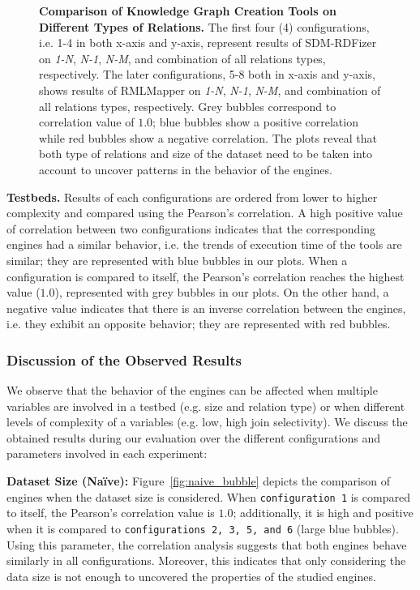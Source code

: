 \begin{figure}[!tb]
    \caption[Knowledge Graph Creation Tools on Different Types of Relations]{\textbf{Comparison of Knowledge Graph Creation Tools on Different Types of Relations.} The first four (4) configurations, i.e. 1-4 in both x-axis and y-axis, represent results of SDM-RDFizer on \textit{1-N}, \textit{N-1}, \textit{N-M}, and combination of all relations types, respectively. The later configurations, 5-8 both in x-axis and y-axis, shows results of RMLMapper on \textit{1-N}, \textit{N-1}, \textit{N-M}, and combination of all relations types, respectively. Grey bubbles correspond to correlation value of $1.0$; blue bubbles show a positive correlation while red bubbles show a negative correlation. The plots reveal that both type of relations and size of the dataset need to be taken into account to uncover patterns in the behavior of the engines. 
    }
    \label{fig:relation_type_bubble}
\end{figure}


\noindent \textbf{Testbeds.}
Results of each configurations are ordered from lower to higher complexity and compared using the Pearson's correlation. 
A high positive value of correlation between two configurations indicates that the corresponding engines had a similar behavior, i.e. the trends of execution time of the tools are similar; they are represented with blue bubbles in our plots. When a configuration is compared to itself, the Pearson's correlation reaches the highest value ($1.0$), represented with grey bubbles in our plots. 
On the other hand, a negative value indicates that there is an inverse correlation between the engines, i.e. they exhibit an opposite behavior; they are represented with red bubbles.


\subsubsection*{Discussion of the Observed Results}
We observe that the behavior of the engines can be affected when multiple variables are involved in a testbed (e.g. size and relation type) or when different levels of complexity of a variables (e.g. low, high join selectivity). We discuss the obtained results during our evaluation over the different configurations and parameters involved in each experiment:   

\noindent \textbf{Dataset Size (Na{\"i}ve):}
Figure~\ref{fig:naive_bubble} depicts the comparison of engines when the dataset size is considered. When \texttt{configuration 1} is compared to itself, the Pearson's correlation value is $1.0$; additionally, it is high and positive when it is compared to \texttt{configurations 2, 3, 5, and 6} (large blue bubbles). 
Using this parameter, the correlation analysis suggests that both engines behave similarly in all configurations. Moreover, this indicates that only considering the data size is not enough to uncovered the properties of the studied engines.


